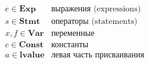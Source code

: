 \clearpage

\begin{center}
$
\begin{array}{ll}
e \in \textbf{Exp}  & \mbox{выражения (expressions)} \\
s \in \textbf{Stmt}  & \mbox{операторы (statements)} \\
x,f \in \textbf{Var} & \mbox{переменные} \\
c \in \textbf{Const}  & \mbox{константы} \\
a \in \textbf{lvalue} & \mbox{левая часть присваивания} \\[1ex]
\end{array}
$
\captionsetup{type=lstlisting}
\label{tbl:notation2}
\end{center}

